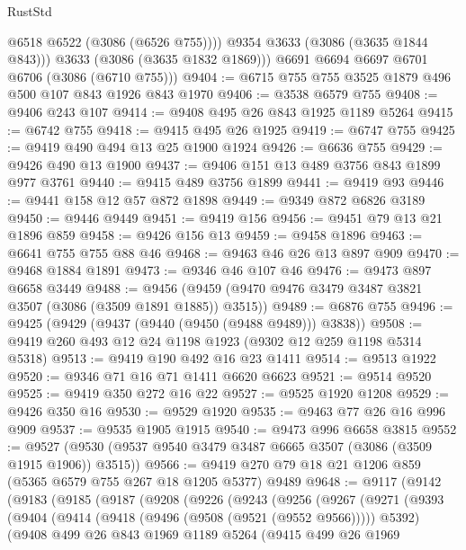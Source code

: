 \begin{lexlean}{RustStd}
\begin{coremodule}
              @6518
              @6522
              (@3086 (@6526 @755))))
          @9354
          @3633
          (@3086 (@3635 @1844 @843)))
        @3633
        (@3086 (@3635 @1832 @1869)))
      @6691
      @6694
      @6697
      @6701
      @6706
      (@3086 (@6710 @755)))
@9404 := @6715 @755 @755 @3525 @1879 @496 @500 @107 @843 @1926 @843 @1970
@9406 := @3538 @6579 @755
@9408 := @9406 @243 @107
@9414 := @9408 @495 @26 @843 @1925 @1189 @5264
@9415 := @6742 @755
@9418 := @9415 @495 @26 @1925
@9419 := @6747 @755
@9425 := @9419 @490 @494 @13 @25 @1900 @1924
@9426 := @6636 @755
@9429 := @9426 @490 @13 @1900
@9437 := @9406 @151 @13 @489 @3756 @843 @1899 @977 @3761
@9440 := @9415 @489 @3756 @1899
@9441 := @9419 @93
@9446 := @9441 @158 @12 @57 @872 @1898
@9449 := @9349 @872 @6826 @3189
@9450 := @9446 @9449
@9451 := @9419 @156
@9456 := @9451 @79 @13 @21 @1896 @859
@9458 := @9426 @156 @13
@9459 := @9458 @1896
@9463 := @6641 @755 @755 @88 @46
@9468 := @9463 @46 @26 @13 @897 @909
@9470 := @9468 @1884 @1891
@9473 := @9346 @46 @107 @46
@9476 := @9473 @897 @6658 @3449
@9488 := @9456 (@9459 (@9470 @9476 @3479 @3487 @3821 @3507 (@3086 (@3509 @1891 @1885)) @3515))
@9489 := @6876 @755
@9496 := @9425 (@9429 (@9437 (@9440 (@9450 (@9488 @9489))) @3838))
@9508 := @9419 @260 @493 @12 @24 @1198 @1923 (@9302 @12 @259 @1198 @5314 @5318)
@9513 := @9419 @190 @492 @16 @23 @1411
@9514 := @9513 @1922
@9520 := @9346 @71 @16 @71 @1411 @6620 @6623
@9521 := @9514 @9520
@9525 := @9419 @350 @272 @16 @22
@9527 := @9525 @1920 @1208
@9529 := @9426 @350 @16
@9530 := @9529 @1920
@9535 := @9463 @77 @26 @16 @996 @909
@9537 := @9535 @1905 @1915
@9540 := @9473 @996 @6658 @3815
@9552 := @9527 (@9530 (@9537 @9540 @3479 @3487 @6665 @3507 (@3086 (@3509 @1915 @1906)) @3515))
@9566 := @9419 @270 @79 @18 @21 @1206 @859 (@5365 @6579 @755 @267 @18 @1205 @5377) @9489
@9648 := @9117
    (@9142
      (@9183
        (@9185
          (@9187
            (@9208
              (@9226
                (@9243
                  (@9256
                    (@9267
                      (@9271
                        (@9393
                          (@9404
                            (@9414 (@9418 (@9496 (@9508 (@9521 (@9552 @9566))))) @5392)
                            (@9408
                              @499
                              @26
                              @843
                              @1969
                              @1189
                              @5264
                              (@9415
                                @499
                                @26
                                @1969

\end{coremodule}
\end{lexlean}
